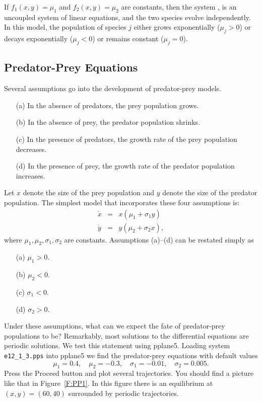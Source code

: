 \documentclass{ximera}
\begin{document}
If $f_1(x,y) = \mu_1$ and $f_2(x,y)=\mu_2$ are constants, then 
the system , is an uncoupled system 
of linear equations, and the two species evolve independently.  
In this model, the population of species $j$ either grows
exponentially ($\mu_j>0$) or decays exponentially ($\mu_j<0$)
or remains constant ($\mu_j=0$).


\subsection*{Predator-Prey Equations}

Several assumptions go into the development of predator-prey 
models. 
\begin{itemize}
\item[(a)]  In the absence of predators, the prey population
grows.
\item[(b)]  In the absence of prey, the predator population 
shrinks.
\item[(c)]  In the presence of predators, the growth rate of
the prey population decreases.
\item[(d)]  In the presence of prey, the growth rate of the 
predator population increases.
\end{itemize}
Let $x$ denote the size of the prey population
 and $y$ denote 
the size of the predator population.  
The simplest model that 
incorporates these four assumptions is:
\begin{equation*} \label{e:PP}
\begin{array}{lcr}
\dot{x} & = & x(\mu_1 + \sigma_1y)\; \\
\dot{y} & = & y(\mu_2 + \sigma_2x),
\end{array}
\end{equation*}
where $\mu_1,\mu_2,\sigma_1,\sigma_2$ are constants.  Assumptions
(a)--(d) can be restated simply as 
\begin{itemize}
\item[(a)]  $\mu_1 > 0$.
\item[(b)]  $\mu_2 < 0$.
\item[(c)]  $\sigma_1 < 0$.
\item[(d)]  $\sigma_2 > 0$.
\end{itemize}
  
Under these assumptions, what can we expect the fate of predator-prey 
populations to be?  Remarkably, most solutions to the differential equations 
 are periodic solutions.  
We test this statement using 
{\sf pplane5}.   
Loading system {\tt e12\_1\_3.pps} into {\sf pplane5}
we find the predator-prey equations with default values
\[
\mu_1 = 0.4, \quad \mu_2 = -0.3, \quad \sigma_1 = -0.01, \quad \sigma_2 = 0.005.
\]
Press the {\sf Proceed} button and plot several trajectories.  You
should find a picture like that in Figure~\ref{F:PP1}.  In this figure 
there is an equilibrium at $(x,y)=(60,40)$ surrounded by periodic 
trajectories. 
\end{document}
